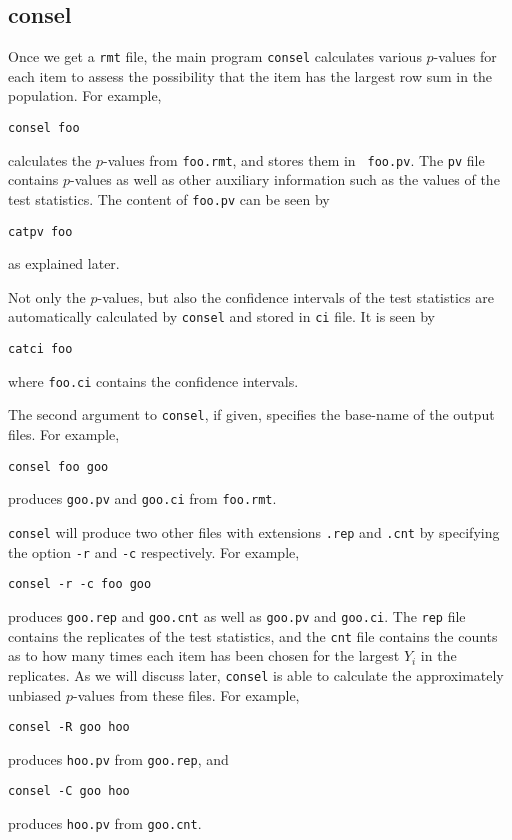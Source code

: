 \documentclass[12pt]{article}
\begin{document}
\subsection{consel}

Once we get a {\tt rmt} file, the main program {\tt consel} calculates
various $p$-values for each item to assess the possibility that the item
has the largest row sum in the population. For example,
\begin{verbatim}
consel foo
\end{verbatim}
calculates the $p$-values from {\tt foo.rmt}, and stores them in {\tt
foo.pv}. The {\tt pv} file contains $p$-values as well as other
auxiliary information such as the values of the test statistics.  The
content of {\tt foo.pv} can be seen by
\begin{verbatim}
catpv foo
\end{verbatim}
as explained later.

Not only the $p$-values, but also the confidence intervals of the test
statistics are automatically calculated by {\tt consel} and stored in
{\tt ci} file. It is seen by
\begin{verbatim}
catci foo
\end{verbatim}
where {\tt foo.ci} contains the confidence intervals.

The second argument to {\tt consel}, if given, specifies the base-name
of the output files. For example,
\begin{verbatim}
consel foo goo
\end{verbatim}
produces {\tt goo.pv} and {\tt goo.ci} from {\tt foo.rmt}.

{\tt consel} will produce two other files with extensions {\tt .rep} and
{\tt .cnt} by specifying the option {\tt -r} and {\tt -c}
respectively. For example,
\begin{verbatim}
consel -r -c foo goo
\end{verbatim}
produces {\tt goo.rep} and {\tt goo.cnt} as well as {\tt goo.pv} and
{\tt goo.ci}. The {\tt rep} file contains the replicates of the test
statistics, and the {\tt cnt} file contains the counts as to how many
times each item has been chosen for the largest $Y_i$ in the
replicates. As we will discuss
later, {\tt consel} is able to calculate the approximately unbiased
$p$-values from these files. For example,
\begin{verbatim}
consel -R goo hoo
\end{verbatim}
produces {\tt hoo.pv} from {\tt goo.rep}, and
\begin{verbatim}
consel -C goo hoo
\end{verbatim}
produces {\tt hoo.pv} from {\tt goo.cnt}.  
\end{document}

